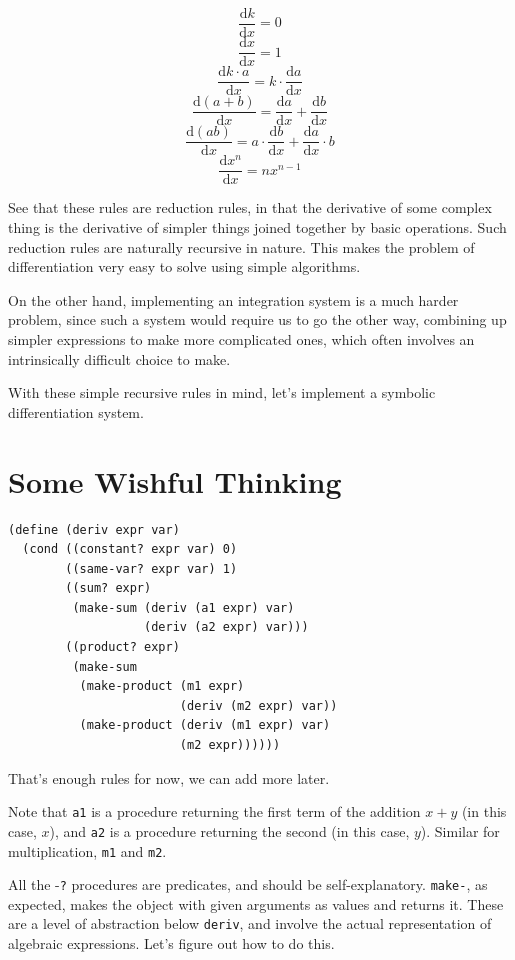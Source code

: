 \documentclass[9pt]{report}
\begin{document}
$$\frac{\mathrm{d}k}{\mathrm{d}x} = 0$$
$$\frac{\mathrm{d}x}{\mathrm{d}x} = 1$$
$$\frac{\mathrm{d}k\cdot a}{\mathrm{d}x} = k\cdot \frac{\mathrm{d}a}{\mathrm{d}x}$$
$$\frac{\mathrm{d}(a+b)}{\mathrm{d}x} =
   \frac{\mathrm{d}a}{\mathrm{d}x} + \frac{\mathrm{d}b}{\mathrm{d}x}$$
$$\frac{\mathrm{d}(ab)}{\mathrm{d}x} =  a\cdot
   \frac{\mathrm{d}b}{\mathrm{d}x} +
   \frac{\mathrm{d}a}{\mathrm{d}x}\cdot b$$
$$\frac{\mathrm{d}x^{n}}{\mathrm{d}x} = nx^{n-1}$$

See that these rules are reduction rules, in that the derivative of
some complex thing is the derivative of simpler things joined
together by basic operations. Such reduction rules are naturally
recursive in nature. This makes the problem of differentiation very
easy to solve using simple algorithms.

On the other hand, implementing an integration system is a much
harder problem, since such a system would require us to go the
other way, combining up simpler expressions to make more
complicated ones, which often involves an intrinsically difficult
choice to make.

With these simple recursive rules in mind, let's implement a
symbolic differentiation system.

\section{Some Wishful Thinking}
\label{sec:org8a6a7a2}

\begin{verbatim}
(define (deriv expr var)
  (cond ((constant? expr var) 0)
        ((same-var? expr var) 1)
        ((sum? expr)
         (make-sum (deriv (a1 expr) var)
                   (deriv (a2 expr) var)))
        ((product? expr)
         (make-sum
          (make-product (m1 expr)
                        (deriv (m2 expr) var))
          (make-product (deriv (m1 expr) var)
                        (m2 expr))))))
\end{verbatim}


That's enough rules for now, we can add more later.

Note that \texttt{a1} is a procedure returning the first term of the
addition \(x+y\) (in this case, \(x\)), and \texttt{a2} is a procedure
returning the second (in this case, \(y\)). Similar for
multiplication, \texttt{m1} and \texttt{m2}.

All the -\texttt{?} procedures are predicates, and should be
self-explanatory. \texttt{make-}, as expected, makes the object with given
arguments as values and returns it. These are a level of
abstraction below \texttt{deriv}, and involve the actual representation of
algebraic expressions. Let's figure out how to do this.
\end{document}

